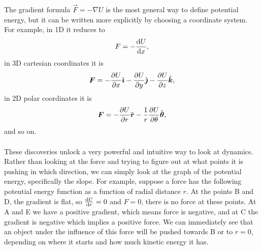 \documentclass[../classical_mechanics.tex]{subfiles}
\begin{document}
        The gradient formula $\vec{F}=-\nabla U$ is the most general way to define potential energy, but it can be written more explicitly by choosing a coordinate system.
        For example, in 1D it reduces to
        \begin{equation}
            F=-\dv{U}{x},
        \end{equation}
        in 3D cartesian coordinates it is
        \begin{equation}
            \vec{F}=-\pdv{U}{x}\ihat-\pdv{U}{y}\jhat-\pdv{U}{z}\khat,
        \end{equation}
        in 2D polar coordinates it is
        \begin{equation}
            \vec{F}=-\pdv{U}{r}\uvec{r}-\frac{1}{r}\pdv{U}{\theta}\uvec{\theta},
        \end{equation}
        and so on.

        \paragraph{}
        These discoveries unlock a very powerful and intuitive way to look at dynamics.
        Rather than looking at the force and trying to figure out at what points it is pushing in which direction, we can simply look at the graph of the potential energy, specifically the slope.
        For example, suppose a force has the following potential energy function as a function of radial distance $r$.
        At the points B and D, the gradient is flat, so $\dv{U}{r}=0$ and $F=0$, there is no force at these points.
        At A and E we have a positive gradient, which means force is negative, and at C the gradient is negative which implies a positive force.
        We can immediately see that an object under the influence of this force will be pushed towards B or to $r=0$, depending on where it starts and how much kinetic energy it has.
\end{document}

